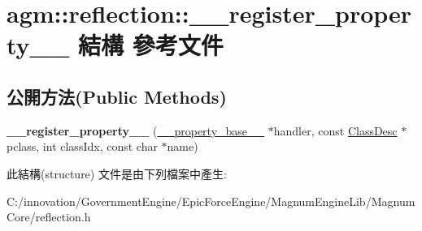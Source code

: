 \hypertarget{structagm_1_1reflection_1_1____register__property____}{}\section{agm\+:\+:reflection\+:\+:\+\_\+\+\_\+register\+\_\+property\+\_\+\+\_\+ 結構 參考文件}
\label{structagm_1_1reflection_1_1____register__property____}
\subsection*{公開方法(Public Methods)}
\begin{DoxyCompactItemize}
\item 
{\bfseries \+\_\+\+\_\+register\+\_\+property\+\_\+\+\_\+} (\hyperlink{structagm_1_1reflection_1_1____property__base____}{\+\_\+\+\_\+property\+\_\+base\+\_\+\+\_\+} $\ast$handler, const \hyperlink{classagm_1_1reflection_1_1_class_desc}{Class\+Desc} $\ast$pclass, int class\+Idx, const char $\ast$name)\hypertarget{structagm_1_1reflection_1_1____register__property_____ab4fe5a3bfffa072901bc44057e7812b3}{}\label{structagm_1_1reflection_1_1____register__property_____ab4fe5a3bfffa072901bc44057e7812b3}

\end{DoxyCompactItemize}


此結構(structure) 文件是由下列檔案中產生\+:\begin{DoxyCompactItemize}
\item 
C\+:/innovation/\+Government\+Engine/\+Epic\+Force\+Engine/\+Magnum\+Engine\+Lib/\+Magnum\+Core/reflection.\+h\end{DoxyCompactItemize}
